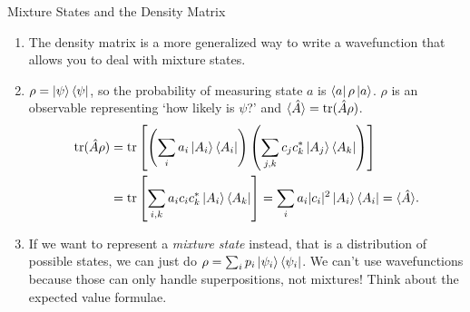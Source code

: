 \documentclass{beamer}
\begin{document}
\begin{frame}{Mixture States and the Density Matrix}
    \begin{enumerate}
        \item The density matrix is a more generalized way to write a wavefunction that allows you to deal with mixture states.

        \item $\rho = \ket{\psi}\bra{\psi}$, so the probability of measuring state $a$ is $\bra{a}\rho\ket{a}$. $\rho$ is an observable representing `how likely is $\psi$?' and $\braket{\hat A} = \mathrm{tr}(\hat A \rho)$.
        \begin{align*}\mathrm{tr}(\hat A \rho) &= \mathrm{tr}\left[\left(\sum_i a_i \ket{A_i} \bra{A_i}\right)\left(\sum_{j,k} c_j c_k^\ast \ket{A_j}\bra{A_k}\right)\right] \\
        &= \mathrm{tr}\left[\sum_{i,k}a_i c_i c_k^\ast \ket{A_i}\bra{A_k}\right]=\sum_ia_i|c_i|^2\ket{A_i}\bra{A_i}=\langle\hat A\rangle.
        \end{align*}

        \item If we want to represent a \emph{mixture state} instead, that is a distribution of possible states, we can just do $\rho = \sum_i p_i \ket{\psi_i}\bra{\psi_i}$. We can't use wavefunctions because those can only handle superpositions, not mixtures! Think about the expected value formulae.
    \end{enumerate}

\end{frame}
\end{document}
